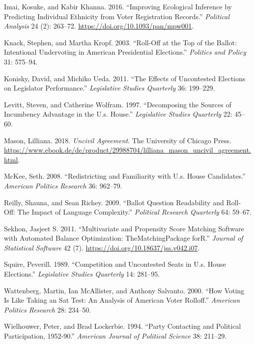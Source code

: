 \documentclass[
  12pt,
]{article}
\newlength{\cslhangindent}
\newenvironment{cslreferences}%
  {\setlength{\parindent}{0pt}%
  \everypar{\setlength{\hangindent}{\cslhangindent}}\ignorespaces}%
  {\par}
\begin{document}
\begin{cslreferences}
\leavevmode\hypertarget{ref-Imai2016}{}%
Imai, Kosuke, and Kabir Khanna. 2016. ``Improving Ecological Inference by Predicting Individual Ethnicity from Voter Registration Records.'' \emph{Political Analysis} 24 (2): 263--72. \url{https://doi.org/10.1093/pan/mpw001}.

\leavevmode\hypertarget{ref-Knack2003}{}%
Knack, Stephen, and Martha Kropf. 2003. ``Roll-Off at the Top of the Ballot: Intentional Undervoting in American Presidential Elections.'' \emph{Politics and Policy} 31: 575--94.

\leavevmode\hypertarget{ref-Konisky2011}{}%
Konisky, David, and Michiko Ueda. 2011. ``The Effects of Uncontested Elections on Legislator Performance.'' \emph{Legislative Studies Quarterly} 36: 199--229.

\leavevmode\hypertarget{ref-Levitt1997}{}%
Levitt, Steven, and Catherine Wolfram. 1997. ``Decomposing the Sources of Incumbency Advantage in the U.s. House.'' \emph{Legislative Studies Quarterly} 22: 45--60.

\leavevmode\hypertarget{ref-Mason2018}{}%
Mason, Lilliana. 2018. \emph{Uncivil Agreement}. The University of Chicago Press. \url{https://www.ebook.de/de/product/29988704/lilliana_mason_uncivil_agreement.html}.

\leavevmode\hypertarget{ref-McKee2008}{}%
McKee, Seth. 2008. ``Redistricting and Familiarity with U.s. House Candidates.'' \emph{American Politics Research} 36: 962--79.

\leavevmode\hypertarget{ref-Reilly2009}{}%
Reilly, Shauna, and Sean Richey. 2009. ``Ballot Question Readability and Roll-Off: The Impact of Language Complexity.'' \emph{Political Research Quarterly} 64: 59--67.

\leavevmode\hypertarget{ref-Sekhon2011}{}%
Sekhon, Jasjeet S. 2011. ``Multivariate and Propensity Score Matching Software with Automated Balance Optimization: TheMatchingPackage forR.'' \emph{Journal of Statistical Software} 42 (7). \url{https://doi.org/10.18637/jss.v042.i07}.

\leavevmode\hypertarget{ref-Squire1989}{}%
Squire, Peverill. 1989. ``Competition and Uncontested Seats in U.s. House Elections.'' \emph{Legislative Studies Quarterly} 14: 281--95.

\leavevmode\hypertarget{ref-Wattenberg2000}{}%
Wattenberg, Martin, Ian McAllister, and Anthony Salvanto. 2000. ``How Voting Is Like Taking an Sat Test: An Analysis of American Voter Rolloff.'' \emph{American Politics Research} 28: 234--50.

\leavevmode\hypertarget{ref-Wielhouwer1994}{}%
Wielhouwer, Peter, and Brad Lockerbie. 1994. ``Party Contacting and Political Participation, 1952-90.'' \emph{American Journal of Political Science} 38: 211--29.


\end{cslreferences}
\end{document}
